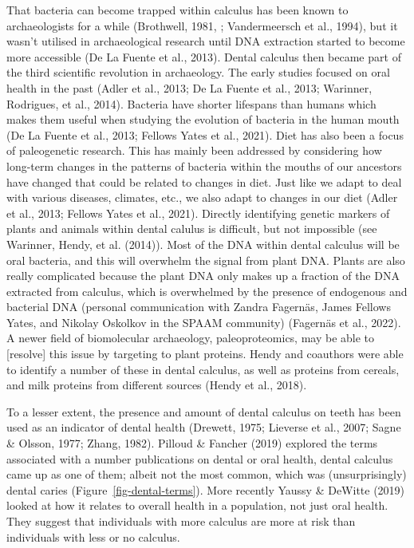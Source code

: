 \documentclass[
  letterpaper,
]{book}
\begin{document}
That bacteria can become trapped within calculus has been known to
archaeologists for a while (Brothwell, 1981, ; Vandermeersch et al.,
1994), but it wasn't utilised in archaeological research until DNA
extraction started to become more accessible (De La Fuente et al.,
2013). Dental calculus then became part of the third scientific
revolution in archaeology. The early studies focused on oral health in
the past (Adler et al., 2013; De La Fuente et al., 2013; Warinner,
Rodrigues, et al., 2014). Bacteria have shorter lifespans than humans
which makes them useful when studying the evolution of bacteria in the
human mouth (De La Fuente et al., 2013; Fellows Yates et al., 2021).
Diet has also been a focus of paleogenetic research. This has mainly
been addressed by considering how long-term changes in the patterns of
bacteria within the mouths of our ancestors have changed that could be
related to changes in diet. Just like we adapt to deal with various
diseases, climates, etc., we also adapt to changes in our diet (Adler et
al., 2013; Fellows Yates et al., 2021). Directly identifying genetic
markers of plants and animals within dental calulus is difficult, but
not impossible (see Warinner, Hendy, et al. (2014)). Most of the DNA
within dental calculus will be oral bacteria, and this will overwhelm
the signal from plant DNA. Plants are also really complicated because
the plant DNA only makes up a fraction of the DNA extracted from
calculus, which is overwhelmed by the presence of endogenous and
bacterial DNA (personal communication with Zandra Fagernäs, James
Fellows Yates, and Nikolay Oskolkov in the SPAAM community) (Fagernäs et
al., 2022). A newer field of biomolecular archaeology, paleoproteomics,
may be able to {[}resolve{]} this issue by targeting to plant proteins.
Hendy and coauthors were able to identify a number of these in dental
calculus, as well as proteins from cereals, and milk proteins from
different sources (Hendy et al., 2018).

To a lesser extent, the presence and amount of dental calculus on teeth
has been used as an indicator of dental health (Drewett, 1975; Lieverse
et al., 2007; Sagne \& Olsson, 1977; Zhang, 1982). Pilloud \& Fancher
(2019) explored the terms associated with a number publications on
dental or oral health, dental calculus came up as one of them; albeit
not the most common, which was (unsurprisingly) dental caries
(Figure~\ref{fig-dental-terms}). More recently Yaussy \& DeWitte (2019)
looked at how it relates to overall health in a population, not just
oral health. They suggest that individuals with more calculus are more
at risk than individuals with less or no calculus.
\end{document}
